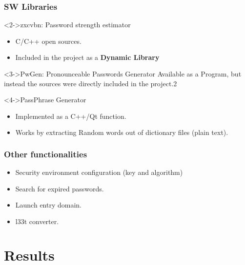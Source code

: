 \documentclass[14pt,usenames,dvipsnames]{beamer}
\begin{document}
\begin{frame}
  \frametitle{SW Libraries}
	  \begin{block}<2->{zxcvbn: Password strength estimator}
		\begin{itemize}
			\item C/C++ open sources.
			\item Included in the project as a \textbf{\color{NavyBlue} Dynamic Library}
		\end{itemize}
	\end{block}


	\begin{block}<3->{PwGen: Pronounceable Passwords Generator}
    Available as a Program, but instead the sources were directly included in the project.2
  \end{block}

	\begin{block}<4->{PassPhrase Generator}
		\begin{itemize}
		  \item Implemented as a C++/Qt function.
		  \item Works by extracting Random words out of dictionary files (plain text).
		\end{itemize}
  \end{block}
\end{frame}

\begin{frame}
	\frametitle{Other functionalities}
	
  \begin{itemize}
    \item<2-> Security environment configuration (key and algorithm)
    \item<3-> Search for expired passwords.
    \item<4-> Launch entry domain.
    \item<5-> l33t converter.
  \end{itemize}  	
	
\end{frame}




\section{Results}
\end{document}
